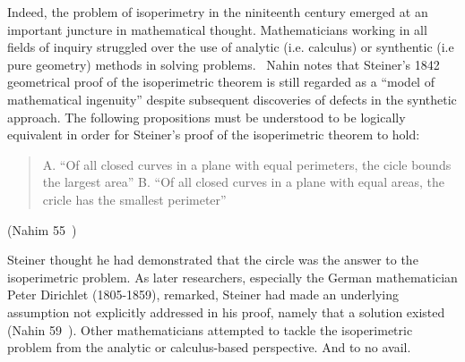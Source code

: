 \documentclass[a4paper]{book}
\begin{document}
Indeed, the problem of isoperimetry in the niniteenth century emerged at an important juncture in mathematical thought. Mathematicians working in all fields of inquiry struggled over the use of analytic (i.e. calculus) or synthentic (i.e pure geometry) methods in solving problems.~\cite{wiegert2010sagacity} Nahin notes that Steiner's 1842 geometrical proof of the isoperimetric theorem is still regarded as a ``model of mathematical ingenuity'' despite subsequent discoveries of defects in the synthetic approach. The following propositions must be understood to be logically equivalent in order for Steiner's proof of the isoperimetric theorem to hold:
\begin{center}
    \begin{quote}
        A. ``Of all closed curves in a plane with equal perimeters, the cicle bounds the largest area''
        \newline
        [and]
        \newline
        B. ``Of all closed curves in a plane with equal areas, the cricle has the smallest perimeter''
    \end{quote}
    (Nahim 55~\cite{nahin2021least})
\end{center}

Steiner thought he had demonstrated that the circle was the answer to the isoperimetric problem. As later researchers, especially the German mathematician Peter Dirichlet (1805-1859), remarked, Steiner had made an underlying assumption not explicitly addressed in his proof, namely that a solution existed (Nahin 59~\cite{nahin2021least}).
\newline
\newline
Other mathematicians attempted to tackle the isoperimetric problem from the analytic or calculus-based perspective. And to no avail.
\end{document}
